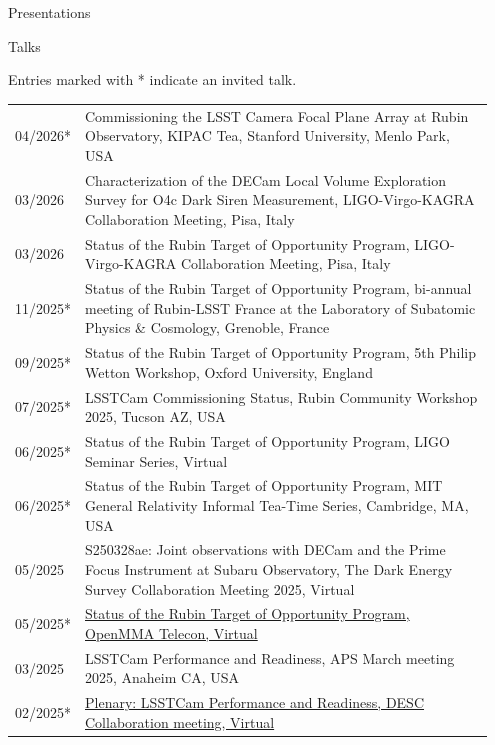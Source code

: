 \documentclass{resume} %
\begin{document}
\begin{rSection}{Presentations}

\begin{rSubsection}{Talks}{}{}{}

Entries marked with * indicate an invited talk.

    \begin{table}[h]
    \setlength{\extrarowheight}{3pt} 
\begin{tabular}{p{0.07\linewidth} p{0.88\linewidth}}
04/2026* & Commissioning the LSST Camera Focal Plane Array at Rubin Observatory, KIPAC Tea, Stanford University, Menlo Park, USA\\
03/2026 & Characterization of the DECam Local Volume Exploration Survey for O4c Dark Siren Measurement, LIGO-Virgo-KAGRA Collaboration Meeting, Pisa, Italy\\
03/2026 & Status of the Rubin Target of Opportunity Program, LIGO-Virgo-KAGRA Collaboration Meeting, Pisa, Italy\\
11/2025* & Status of the Rubin Target of Opportunity Program, bi-annual meeting of Rubin-LSST France at the Laboratory of Subatomic Physics \& Cosmology, Grenoble, France\\
09/2025* & Status of the Rubin Target of Opportunity Program, 5th Philip Wetton Workshop, Oxford University, England\\
07/2025* & LSSTCam Commissioning Status, Rubin Community Workshop 2025, Tucson AZ, USA\\
06/2025* & Status of the Rubin Target of Opportunity Program, LIGO Seminar Series, Virtual\\
06/2025* & Status of the Rubin Target of Opportunity Program, MIT General Relativity Informal Tea-Time Series, Cambridge, MA, USA\\
05/2025 & S250328ae: Joint observations with DECam and the Prime Focus Instrument at Subaru Observatory, The Dark Energy Survey Collaboration Meeting 2025, Virtual\\
05/2025* & \href{https://github.com/scimma/openMMA/wiki/Telecon20250522}{Status of the Rubin Target of Opportunity Program, OpenMMA Telecon, Virtual}\\
03/2025 & LSSTCam Performance and Readiness, APS March meeting 2025, Anaheim CA, USA\\
02/2025* & \href{https://docs.google.com/presentation/d/18RmTzV5id9RSE4_1xui-RJvK5FeGknrt8Ro1nBn32nk/edit?usp=sharing}{Plenary: LSSTCam Performance and Readiness, DESC Collaboration meeting, Virtual}\\

\end{tabular}
\end{table}
\end{rSubsection}
\end{rSection}
\end{document}
